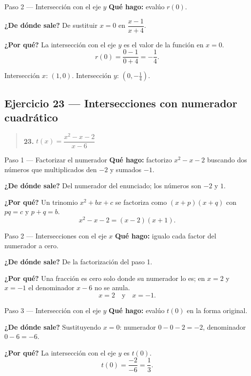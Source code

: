 \documentclass[11pt]{article}
\begin{document}
\begin{paso}{Paso 2 --- Intersección con el eje $y$}
\textbf{Qué hago:} evalúo $r(0)$.

\textbf{¿De dónde sale?} De sustituir $x=0$ en $\dfrac{x-1}{x+4}$.

\textbf{¿Por qué?} La intersección con el eje $y$ es el valor de la función en $x=0$.
\[
r(0)=\frac{0-1}{0+4}=-\frac14 .
\]
\end{paso}

\begin{resp}
Intersección $x$: $(1,0)$. \quad Intersección $y$: $\left(0,-\tfrac14\right)$.
\end{resp}

\subsection*{Ejercicio 23 — Intersecciones con numerador cuadrático}

\begin{quote}
\textbf{23.} $t(x)=\dfrac{x^2-x-2}{x-6}$
\end{quote}

\begin{paso}{Paso 1 --- Factorizar el numerador}
\textbf{Qué hago:} factorizo $x^2-x-2$ buscando dos números que multiplicados den $-2$ y sumados $-1$.

\textbf{¿De dónde sale?} Del numerador del enunciado; los números son $-2$ y $1$.

\textbf{¿Por qué?} Un trinomio $x^2+bx+c$ se factoriza como $(x+p)(x+q)$ con $pq=c$ y $p+q=b$.
\[
x^2-x-2=(x-2)(x+1).
\]
\end{paso}

\begin{paso}{Paso 2 --- Intersecciones con el eje $x$}
\textbf{Qué hago:} igualo cada factor del numerador a cero.

\textbf{¿De dónde sale?} De la factorización del paso 1.

\textbf{¿Por qué?} Una fracción es cero solo donde su numerador lo es; en $x=2$ y $x=-1$ el denominador $x-6$ no se anula.
\[
x=2 \quad\text{y}\quad x=-1 .
\]
\end{paso}

\begin{paso}{Paso 3 --- Intersección con el eje $y$}
\textbf{Qué hago:} evalúo $t(0)$ en la forma original.

\textbf{¿De dónde sale?} Sustituyendo $x=0$: numerador $0-0-2=-2$, denominador $0-6=-6$.

\textbf{¿Por qué?} La intersección con el eje $y$ es $t(0)$.
\[
t(0)=\frac{-2}{-6}=\frac13 .
\]
\end{paso}
\end{document}
